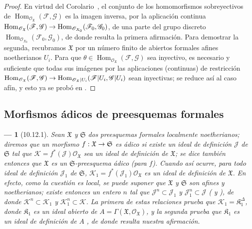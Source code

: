 \documentclass[oneside]{amsart}
\theoremstyle{ega-env-style}
\newtheorem*{env}{---}
\theoremstyle{ega-thm-env-style}
\theoremstyle{ega-defn-env-style}
\renewcommand{\to}{\mathchoice{\longrightarrow}{\rightarrow}{\rightarrow}{\rightarrow}}
\newcommand{\oldpage}[2][]{{\marginnote{\normalfont{\textbf{#1}~|~#2}}}\ignorespaces}
\let\EGAOriginalLabel\label
\renewcommand{\label}[1]{\phantomsection\EGAOriginalLabel{#1}}
\begin{document}
\begin{proof}
En virtud del Corolario~, el conjunto de los homomorfismos sobreyectivos de $\operatorname{Hom}_{\mathscr{O}_{\mathfrak{X}}}
(\mathscr{F},\mathscr{G})$ es la imagen inversa, por la aplicación continua $\operatorname{Hom}_{\mathscr{O}_{\mathfrak{X}}}
(\mathscr{F},\mathscr{G})\to
\operatorname{Hom}_{\mathscr{O}_{X_0}}(\mathscr{F}_0,\mathscr{G}_0)$, de una parte del grupo discreto $\operatorname{Hom}_{\mathscr{O}_{X_0}}(\mathscr{F}_0,\mathscr{G}_0)$, de donde resulta la primera afirmación.
Para demostrar la segunda, recubramos $\mathfrak{X}$ por un número finito de abiertos formales afines noetherianos $U_i$.
Para que $\theta\in\operatorname{Hom}_{\mathscr{O}_{\mathfrak{X}}}
(\mathscr{F},\mathscr{G})$ sea inyectivo, es necesario y suficiente que todas sus imágenes por las aplicaciones (continuas) de restricción $\operatorname{Hom}_{\mathscr{O}_{\mathfrak{X}}}
(\mathscr{F},\mathscr{G})\to
\operatorname{Hom}_{\mathscr{O}_{\mathfrak{X}}|U_i}
(\mathscr{F}|U_i,\mathscr{G}|U_i)$ sean inyectivas; se reduce así al caso afín, y esto ya se probó en .
\end{proof}

\oldpage[I]{206}
\subsection{Morfismos ádicos de preesquemas formales}
\label{subsection:I.10.12}

\begin{env}[10.12.1]
\label{I.10.12.1}
Sean $\mathfrak{X}$ y $\mathfrak{S}$ dos preesquemas formales \emph{localmente noetherianos};
diremos que un morfismo $f:\mathfrak{X}\to\mathfrak{S}$ es \emph{ádico} si existe un ideal de definición $\mathscr{J}$ de $\mathfrak{S}$ tal que $\mathscr{K}=f^*(\mathscr{J})\mathscr{O}_{\mathfrak{X}}$ sea un ideal de definición de $\mathfrak{X}$;
se dice también entonces que $\mathfrak{X}$ es un \emph{$\mathfrak{S}$-preesquema ádico} (para $f$).
Cuando así ocurre, para \emph{todo} ideal de definición $\mathscr{J}_1$ de $\mathfrak{S}$, $\mathscr{K}_1=f^*(\mathscr{J}_1)\mathscr{O}_{\mathfrak{X}}$ es un ideal de definición de $\mathfrak{X}$.
En efecto, como la cuestión es local, se puede suponer que $\mathfrak{X}$ y $\mathfrak{S}$ son afines y noetherianos;
existe entonces un entero $n$ tal que $\mathscr{J}^n\subset\mathscr{J}_1$ y $\mathscr{J}_1^n\subset\mathscr{J}$ ( y ), de donde $\mathscr{K}^n\subset\mathscr{K}_1$ y $\mathscr{K}_1^n\subset\mathscr{K}$.
La primera de estas relaciones prueba que $\mathscr{K}_1=\mathfrak{K}_1^\Delta$, donde $\mathfrak{K}_1$ es un ideal abierto de $A=\Gamma(\mathfrak{X},\mathscr{O}_{\mathfrak{X}})$, y la segunda prueba que $\mathfrak{K}_1$ es un ideal de definición de $A$ , de donde resulta nuestra afirmación.
\end{env}
\end{document}
